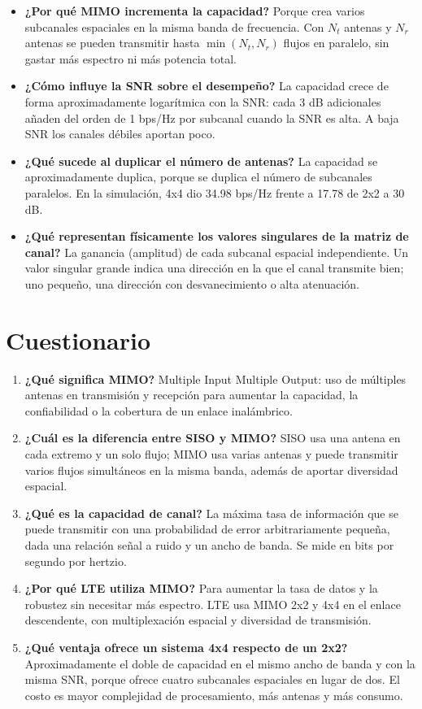 \documentclass[11pt,a4paper]{article}
\begin{document}
\begin{itemize}
  \item \textbf{¿Por qué MIMO incrementa la capacidad?} Porque crea varios subcanales
        espaciales en la misma banda de frecuencia. Con $N_t$ antenas y $N_r$ antenas se
        pueden transmitir hasta $\min(N_t,N_r)$ flujos en paralelo, sin gastar más espectro
        ni más potencia total.
  \item \textbf{¿Cómo influye la SNR sobre el desempeño?} La capacidad crece de forma
        aproximadamente logarítmica con la SNR: cada 3 dB adicionales añaden del orden de
        1 bps/Hz por subcanal cuando la SNR es alta. A baja SNR los canales débiles aportan
        poco.
  \item \textbf{¿Qué sucede al duplicar el número de antenas?} La capacidad se
        aproximadamente duplica, porque se duplica el número de subcanales paralelos. En la
        simulación, 4x4 dio 34.98 bps/Hz frente a 17.78 de 2x2 a 30 dB.
  \item \textbf{¿Qué representan físicamente los valores singulares de la matriz de canal?}
        La ganancia (amplitud) de cada subcanal espacial independiente. Un valor singular
        grande indica una dirección en la que el canal transmite bien; uno pequeño, una
        dirección con desvanecimiento o alta atenuación.
\end{itemize}

\section{Cuestionario}

\begin{enumerate}
  \item \textbf{¿Qué significa MIMO?} Multiple Input Multiple Output: uso de múltiples
        antenas en transmisión y recepción para aumentar la capacidad, la confiabilidad o
        la cobertura de un enlace inalámbrico.
  \item \textbf{¿Cuál es la diferencia entre SISO y MIMO?} SISO usa una antena en cada
        extremo y un solo flujo; MIMO usa varias antenas y puede transmitir varios flujos
        simultáneos en la misma banda, además de aportar diversidad espacial.
  \item \textbf{¿Qué es la capacidad de canal?} La máxima tasa de información que se puede
        transmitir con una probabilidad de error arbitrariamente pequeña, dada una relación
        señal a ruido y un ancho de banda. Se mide en bits por segundo por hertzio.
  \item \textbf{¿Por qué LTE utiliza MIMO?} Para aumentar la tasa de datos y la robustez sin
        necesitar más espectro. LTE usa MIMO 2x2 y 4x4 en el enlace descendente, con
        multiplexación espacial y diversidad de transmisión.
  \item \textbf{¿Qué ventaja ofrece un sistema 4x4 respecto de un 2x2?} Aproximadamente el
        doble de capacidad en el mismo ancho de banda y con la misma SNR, porque ofrece
        cuatro subcanales espaciales en lugar de dos. El costo es mayor complejidad de
        procesamiento, más antenas y más consumo.
\end{enumerate}
\end{document}
